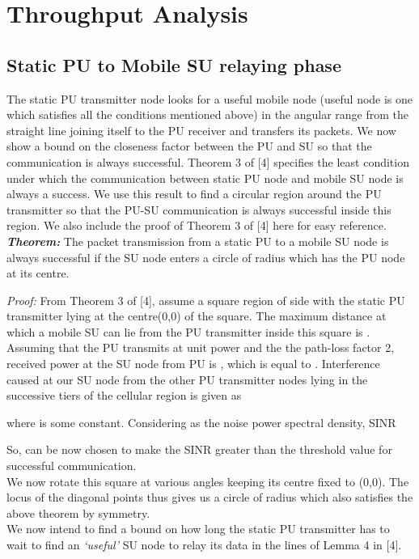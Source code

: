 \documentclass[conference]{IEEEtran}
\begin{document}
\section{Throughput Analysis}
\subsection{Static PU to Mobile SU relaying phase}
The static PU transmitter node looks for a useful mobile node (useful node is one which satisfies all the conditions mentioned above) in the angular range  from the 
straight line joining itself to the PU receiver and transfers its packets. We now show a bound on the closeness factor between the PU and SU so that the communication is always successful. 
Theorem 3 of [4] specifies the least condition under which the communication between static PU node and mobile SU node is always a success. We use this result to find a circular 
region around the PU transmitter so that the PU-SU communication is always successful inside this region. We also include the proof of Theorem 3 of [4] here for easy reference.\\

\emph{\bf Theorem:} The packet transmission from a static PU to a mobile SU node is always successful if the SU node enters a circle of radius  which has the PU node 
at its centre.

\emph{Proof:} From Theorem 3 of [4], assume a square region of side  with the static PU transmitter lying at the centre(0,0) of the square. The maximum distance at which a 
mobile SU can lie from the PU transmitter inside this square is . Assuming that the PU transmits at unit power and the the path-loss factor 2, received power at the 
SU node from PU is , which is equal to . Interference caused at our SU node from the other PU transmitter nodes lying in the successive 
tiers of the cellular region is given as

\vspace{4mm}
where  is some constant. Considering  as the noise power spectral density, SINR


So,  can be now chosen to make the SINR greater than the threshold value for successful communication.\\
We now rotate this square at various angles keeping its centre fixed to (0,0). The locus of the diagonal points thus gives us a circle of radius  which also satisfies the above 
theorem by symmetry.\quad\quad\quad\quad\quad\quad\quad\quad\quad\quad\quad\quad\quad\quad\quad\quad\quad\quad\quad\quad\\
We now intend to find a bound on how long the static PU transmitter has to wait to find an \textit{`useful'} SU node to relay its data in the lines of Lemma 4 in [4].
\end{document}
